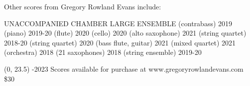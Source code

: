 \documentclass[11pt]{article}
\begin{document}

\begin{center}
\fontsize{.6cm}{1em}\selectfont Other scores from Gregory Rowland Evans include: \hfill
\end{center}
\vspace*{4\baselineskip}
{
\begin{center}
\setlength{\columnseprule}{1pt}
\setlength{\columnsep}{6em}

\begin{paracol}{3}
\fontsize{.3cm}{1em}\selectfont UNACCOMPANIED
\switchcolumn[1]
\fontsize{.3cm}{1em}\selectfont CHAMBER
\switchcolumn[2]
\fontsize{.3cm}{1em}\selectfont LARGE ENSEMBLE
\switchcolumn[0]
\fontsize{.1cm}{0.5em}  (contrabass) 2019
\switchcolumn[0]
\fontsize{.1cm}{0.5em}  (piano) 2019-20
\switchcolumn[0]
\fontsize{.1cm}{0.5em}  (flute) 2020
\switchcolumn[0]
\fontsize{.1cm}{0.5em}  (cello) 2020
\switchcolumn[0]
\fontsize{.1cm}{0.5em}  (alto saxophone) 2021
\switchcolumn[1]
\fontsize{.1cm}{0.5em}  (string quartet) 2018-20
\switchcolumn[1]
\fontsize{.1cm}{0.5em}  (string quartet) 2020
\switchcolumn[1]
\fontsize{.1cm}{0.5em}  (bass flute, guitar) 2021
\switchcolumn[1]
\fontsize{.1cm}{0.5em}  (mixed quartet) 2021
\switchcolumn[2]
\fontsize{.1cm}{0.5em}  (orchestra) 2018
\switchcolumn[2]
\fontsize{.1cm}{0.5em}  (21 saxophones) 2018
\switchcolumn[2]
\fontsize{.1cm}{0.5em}  (string ensemble) 2019-20


\end{paracol}
\end{center}
}

\begin{textblock}{23}(0, 23.5)
-2023 \hfill
Scores available for purchase at www.gregoryrowlandevans.com \hfill
\$30
\end{textblock}
\end{document}
